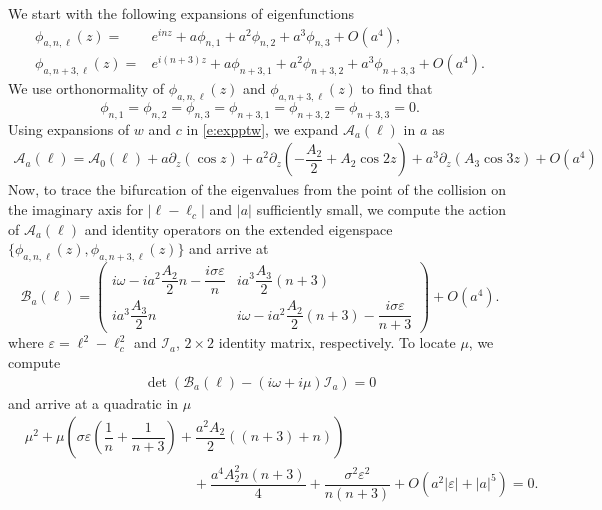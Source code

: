\documentclass[12pt]{amsart}    %
\numberwithin{equation}{section}
\begin{document}
We start with the following expansions of eigenfunctions\cite{Creedon2021High-FrequencyApproach}
\begin{align}\label{eq:eig1}
    \phi_{a,n,\ell}(z) =& e^{inz}+a\phi_{n,1}+a^2\phi_{n,2}+a^3\phi_{n,3}+O(a^4), \\
    \phi_{a,n+3,\ell}(z) =& e^{i(n+3)z}+a\phi_{n+3,1}+a^2\phi_{n+3,2}+a^3\phi_{n+3,3}
      +O(a^4).\label{eq:eig2}
\end{align}
We use orthonormality of $\phi_{a,n,\ell}(z)$ and $\phi_{a,n+3,\ell}(z)$ to find that
\[
 \phi_{n,1}=\phi_{n,2}=\phi_{n,3}=\phi_{n+3,1}=\phi_{n+3,2}=\phi_{n+3,3}= 0.
\]
Using expansions of $w$ and $c$ in \eqref{e:expptw}, we expand $\mathcal{A}_{a}(\ell)$ in $a$ as
\begin{align}\label{eq:expA}
\mathcal{A}_{a}(\ell)=\mathcal{A}_{0}(\ell)+a\partial_z (\cos z)+a^2\partial_z\left(-\dfrac{A_2}{2}+A_2\cos 2z\right)+a^3\partial_z(A_3\cos 3z)+O(a^4)
\end{align}
Now, to trace the bifurcation of the eigenvalues from the point of the collision on the imaginary axis for $|\ell-\ell_c|$ and $|a|$ sufficiently small, we compute the action of $\mathcal{A}_a(\ell)$ and identity operators on the extended eigenspace $\{\phi_{a,n,\ell}(z), \phi_{a,n+3,\ell}(z)\}$ and arrive at
\begin{equation*}
    \mathcal{B}_a(\ell) = \begin{pmatrix} i\omega-ia^2\dfrac{A_2}{2}n-\dfrac{i\sigma \varepsilon}{n} & ia^3\dfrac{A_3}{2}(n+3) \\ ia^3\dfrac{A_3}{2}n & i\omega-ia^2\dfrac{A_2}{2}(n+3)-\dfrac{i\sigma \varepsilon}{n+3}
    \end{pmatrix} + O(a^4).
\end{equation*}
where $\varepsilon=\ell^2-\ell_c^2$ and $\mathcal{I}_a$, $2\times 2$ identity matrix, respectively. To locate $\mu$, we compute 
\begin{align}\label{eq:cheq1p}
    \textbf{$\det(\mathcal{B}_{a}(\ell)-(i \omega + i \mu) \mathcal{I}_{a}) = 0$}
\end{align}
and arrive at a quadratic in $\mu$
\begin{align*}
   &\mu^2  + \mu \left(\sigma \varepsilon \left(\dfrac{1}{n}+\dfrac{1}{n+3}\right)+\dfrac{a^2A_2}{2}((n+3)+n)  \right)\\
   &\qquad \qquad \qquad \qquad \qquad \qquad + \dfrac{a^4A_2^2n(n+3)}{4}+\dfrac{\sigma^2 \varepsilon^2}{n(n+3)}+O(a^2|\varepsilon|+ |a|^5)=0.
\end{align*}
\end{document}
